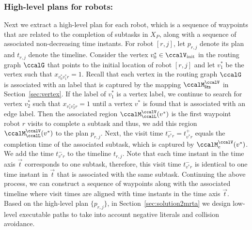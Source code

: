 \documentclass[Afour,sageh,times]{sagej}
\begin{document}
{{{\subsubsection{High-level plans for robots:} Next we extract a high-level plan for each robot, which is a sequence of waypoints that are related  to  the completion of subtasks in $X_P$, along with a sequence of associated non-decreasing time instants. For robot $[r,j]$, let $p_{r,j}$ denote its plan and $t_{r,j}$ denote the  timeline. Consider the vertex $v^*_0 \in \ccalV_{\text{init}}$ in the routing graph $\ccalG$ that points to the initial location of  robot $[r,j]$  and let $v^*_1$ be the vertex such that $x_{v^*_0 v^*_1 r} =1$. Recall that each vertex in the routing graph $\ccalG$ is associated with an label that is captured by the mapping $\ccalM_{\mathsf{lits}}^{\ccalV}$ in Section~\ref{sec:vertex}. If the label of $v_1^*$ is a vertex label, we continue to search for vertex $v_2^*$ such that $x_{v_1^* v_2^* r}=1$ until a vertex $v^*$ is found that is associated with an edge label. Then the associated region  $\ccalM^\ccalV_{\ccalL}(v^*)$ is the first waypoint robot $r$ visits to complete a subtask and thus, we add this region $\ccalM^\ccalV_{\ccalL}(v^*)$ to the plan $p_{r,j}$. Next, the visit time  $t^-_{v^* r} = t^+_{v^* r}$ equals the completion time of the associated subtask, which is captured by $\ccalM_{e}^{\ccalV}(v^*)$. We add the time $t^-_{v^* r}$ to the timeline $t_{r,j}$. Note that each time instant in the time axis $\vec{t}$ corresponds to one subtask, therefore, this visit time $t^-_{v^* r}$ is identical to one time instant in $\vec{t}$ that is associated with the same subtask.   Continuing the above process, we can construct a sequence of waypoints along with the associated timeline where visit times are aligned with time instants in the time axis $\vec{t}$. Based on the high-level plan $\{p_{r,j}\}$, in Section~\ref{sec:solution2mrta} we design low-level executable paths to take into account negative literals and collision avoidance.

}}}
\end{document}
